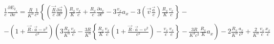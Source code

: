 \documentclass[11pt]{article}
\begin{document}
\[\begin{align}
  & \frac{1}{e}\frac{\partial {{E}_{2}}_{_{x}}}{\partial x}=\frac{R}{{{K}^{3}}}\frac{1}{{{c}^{2}}}\left\{ \left( \frac{\overrightarrow{R}}{c}\frac{\partial \overrightarrow{a}}{\partial t'} \right)\frac{{{R}_{x}}}{K}\frac{{{v}_{x}}}{c}+\frac{{{R}_{x}}}{c}\frac{\partial {{a}_{x}}}{\partial t'}-3\frac{{{v}_{x}}}{c}{{a}_{x}}-3\left( \overrightarrow{v}\frac{\overrightarrow{a}}{c} \right)\frac{{{R}_{x}}}{K}\frac{{{v}_{x}}}{c} \right\}- \\
 & -\left( 1+\frac{\overrightarrow{R}\cdot \overrightarrow{a}-{{v}^{2}}}{{{c}^{2}}} \right)\left( 3\frac{{{R}_{x}}}{{{K}^{4}}}\frac{{{v}_{x}}}{c}-\frac{3R}{{{K}^{4}}}\left\{ \frac{{{R}_{x}}}{K}\frac{{{v}_{x}}}{c}\left( 1+\frac{\overrightarrow{R}\cdot \overrightarrow{a}-{{v}^{2}}}{{{c}^{2}}} \right)-\frac{{{v}_{x}}}{c}\frac{{{v}_{x}}}{c} \right\}-\frac{3R}{{{K}^{3}}{{c}^{2}}}\frac{{{R}_{x}}}{K}{{a}_{x}} \right)-2\frac{{{R}_{x}}}{{{K}^{3}}}\frac{{{a}_{x}}}{{{c}^{2}}}+\frac{2}{{{K}^{3}}}\frac{{{v}_{x}}}{c}\frac{{{x}_{x}}}{c} \\
\end{align}\]
\end{document}
